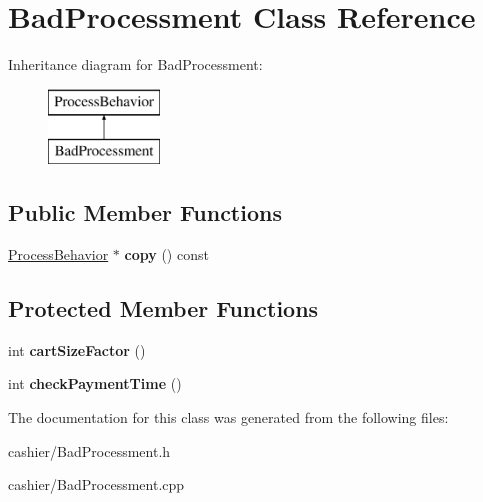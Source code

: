 \hypertarget{classBadProcessment}{\section{Bad\-Processment Class Reference}
\label{classBadProcessment}
}
Inheritance diagram for Bad\-Processment\-:\begin{figure}[H]
\begin{center}
\leavevmode
\includegraphics[height=2.000000cm]{classBadProcessment}
\end{center}
\end{figure}
\subsection*{Public Member Functions}
\begin{DoxyCompactItemize}
\item 
\hypertarget{classBadProcessment_a682870ce18151f42f864fd22ab61363f}{\hyperlink{classProcessBehavior}{Process\-Behavior} $\ast$ {\bfseries copy} () const }\label{classBadProcessment_a682870ce18151f42f864fd22ab61363f}

\end{DoxyCompactItemize}
\subsection*{Protected Member Functions}
\begin{DoxyCompactItemize}
\item 
\hypertarget{classBadProcessment_a921c2f0f7fa59d0f92a35ddc440eeffb}{int {\bfseries cart\-Size\-Factor} ()}\label{classBadProcessment_a921c2f0f7fa59d0f92a35ddc440eeffb}

\item 
\hypertarget{classBadProcessment_aba28469024834d364c3d599436732204}{int {\bfseries check\-Payment\-Time} ()}\label{classBadProcessment_aba28469024834d364c3d599436732204}

\end{DoxyCompactItemize}


The documentation for this class was generated from the following files\-:\begin{DoxyCompactItemize}
\item 
cashier/Bad\-Processment.\-h\item 
cashier/Bad\-Processment.\-cpp\end{DoxyCompactItemize}
